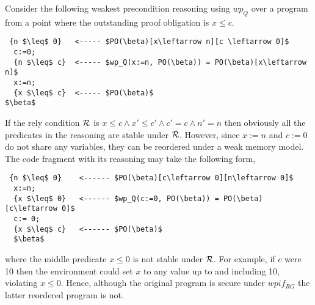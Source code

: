 Consider the following weakest precondition reasoning using $wp_Q$ over a program from a point where the outstanding proof obligation is $x \leq c$.
  
\begin{lstlisting}
 {n $\leq$ 0}   <----- $PO(\beta)[x\leftarrow n][c \leftarrow 0]$
  c:=0; 
  {n $\leq$ c}  <----- $wp_Q(x:=n, PO(\beta)) = PO(\beta)[x\leftarrow n]$
  x:=n;
  {x $\leq$ c}  <----- $PO(\beta)$
$\beta$ 
\end{lstlisting}
If the rely condition $\mathcal{R}$ is $x \leq c \land x'\leq c' \land c'=c \land n'=n$ then obviously all the predicates in the reasoning are stable under $\mathcal{R}$. However, since $x:=n$ and $c:=0$ do not share any variables, they can be reordered under a weak memory model. The code fragment with its reasoning may take the following form,

\begin{lstlisting}
 {n $\leq$ 0}    <------ $PO(\beta)[c\leftarrow 0][n\leftarrow 0]$
  x:=n; 
  {x $\leq$ 0}   <------ $wp_Q(c:=0, PO(\beta)) = PO(\beta)[c\leftarrow 0]$
  c:= 0;
  {x $\leq$ c}   <------ $PO(\beta)$
  $\beta$
\end{lstlisting}
where the middle predicate $x \leq 0$ is not stable under $\mathcal{R}$. For example, if $c$ were 10 then the environment could set $x$ to any value up to and including 10, violating $x \leq 0$.  Hence, although the original program is secure under $wpi\!f_{RG}$ the latter reordered program is not.



